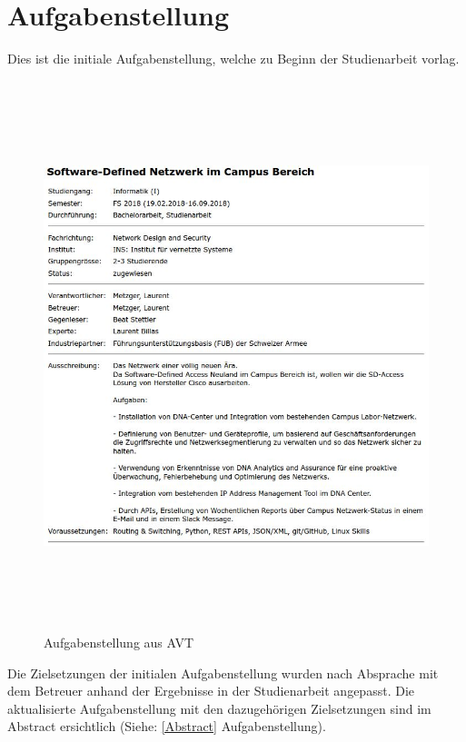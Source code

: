 \section{Aufgabenstellung}
Dies ist die initiale Aufgabenstellung, welche zu Beginn der Studienarbeit vorlag. 

\begin{figure}[H]
	\centering
	\includegraphics[height=16cm]{img/aufgabenstellung.jpg}
	\caption{Aufgabenstellung aus AVT \cite{avt-tool}}
	\label{fig:Aufgabenstellung}
\end{figure}

Die Zielsetzungen der initialen Aufgabenstellung wurden nach Absprache mit dem Betreuer anhand der Ergebnisse in der Studienarbeit angepasst. Die aktualisierte Aufgabenstellung mit den dazugehörigen Zielsetzungen sind im Abstract ersichtlich (Siehe: \ref{Abstract} Aufgabenstellung).
